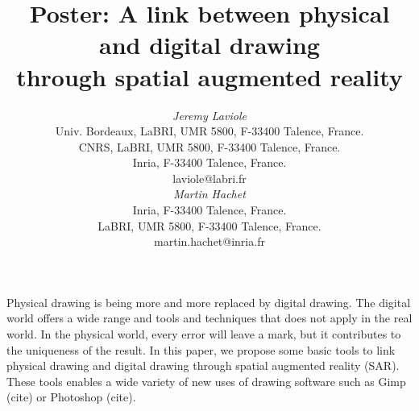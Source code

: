 \documentclass{article}
\begin{document}




\title{Poster: A link between physical and digital drawing \\
       through spatial augmented reality}


\author{
\parbox[t]{9cm}{\centering
	     {\em Jeremy Laviole}\\
	     Univ. Bordeaux, LaBRI, UMR 5800, F-33400 Talence, France.\\
         CNRS, LaBRI, UMR 5800, F-33400 Talence, France.\\
	     Inria, F-33400 Talence, France.\\
	     laviole@labri.fr}
\parbox[t]{9cm}{\centering
	     {\em Martin Hachet}\\
	     Inria, F-33400 Talence, France.\\
	     LaBRI, UMR 5800, F-33400 Talence, France.\\
	     martin.hachet@inria.fr}
}

\maketitle

\abstract

Physical drawing is being more and more replaced by digital drawing. The digital world offers a wide range and tools and techniques that does not apply in the real world. In the physical world, every error will leave a mark, but it contributes to the uniqueness of the result. In this paper, we propose some basic tools to link physical drawing and digital drawing through spatial augmented reality (SAR). These tools enables a wide variety of new uses of drawing software such as Gimp (cite) or Photoshop (cite). 
\end{document}
